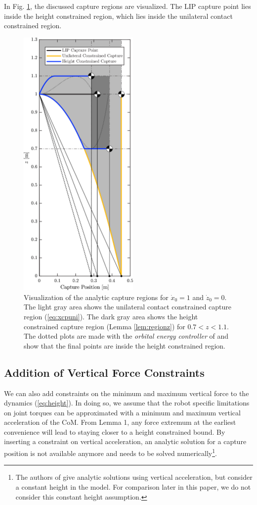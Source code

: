 \documentclass[letterpaper, 10 pt, conference]{ieeeconf}  %
\begin{document}
In Fig. \ref{fig:capregion}, the discussed capture regions are visualized. The LIP capture point lies inside the height constrained region, which lies inside the unilateral contact constrained region.
\begin{figure}
      \centering
      \includegraphics[width=2.3in]{CPLimitsDark.png}
      \caption{Visualization of the analytic capture regions for $\dot{x}_0=1$ and $\dot{z}_0=0$. The light gray area shows the unilateral contact constrained capture region (\ref{eq:xcpuni}). The dark gray area shows the height constrained capture region (Lemma \ref{lem:regionz})  for $0.7<z<1.1$. The dotted plots are made with the \textit{orbital energy controller} of \cite{koolen2016balance} and show that the final points are inside the height constrained region.}
      \label{fig:capregion}
\end{figure}

\subsection{Addition of Vertical Force Constraints}\label{forcecapture}
We can also add constraints on the minimum and maximum vertical force to the dynamics (\ref{eq:height}). In doing so, we assume that the robot specific limitations on joint torques can be approximated with a minimum and maximum vertical acceleration of the CoM. From Lemma 1, any force extremum at the earliest convenience will lead to staying closer to a height constrained bound. By inserting a constraint on vertical acceleration, an analytic solution for a capture position is not available anymore and needs to be solved numerically\footnote[1]{The authors of \cite{gao2017increase} give analytic solutions using vertical acceleration, but consider a constant height in the model. For comparison later in this paper, we do not consider this constant height assumption.}.
     
\end{document}
